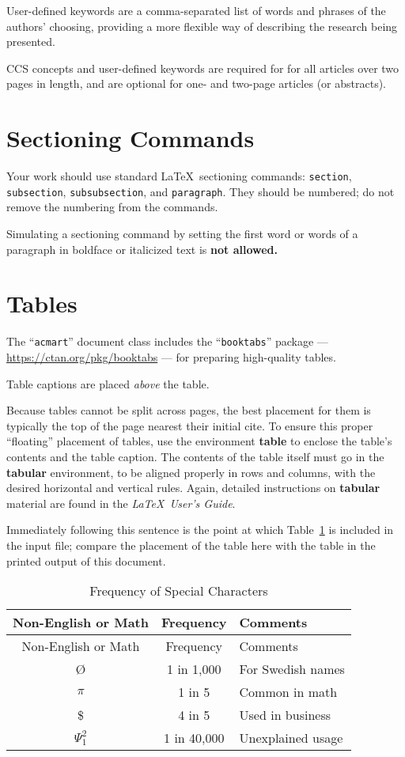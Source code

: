 \documentclass[manuscript,screen,review]{acmart}
\begin{document}
User-defined keywords are a comma-separated list of words and phrases of
the authors' choosing, providing a more flexible way of describing the
research being presented.

CCS concepts and user-defined keywords are required for for all articles
over two pages in length, and are optional for one- and two-page
articles (or abstracts).

\section{Sectioning Commands}\label{sectioning-commands}

Your work should use standard \LaTeX~sectioning commands:
\texttt{section}, \texttt{subsection}, \texttt{subsubsection}, and
\texttt{paragraph}. They should be numbered; do not remove the numbering
from the commands.

Simulating a sectioning command by setting the first word or words of a
paragraph in boldface or italicized text is \textbf{not allowed.}

\section{Tables}\label{tables}

The ``\texttt{acmart}'' document class includes the
``\texttt{booktabs}'' package --- \url{https://ctan.org/pkg/booktabs}
--- for preparing high-quality tables.

Table captions are placed \emph{above} the table.

Because tables cannot be split across pages, the best placement for them
is typically the top of the page nearest their initial cite. To ensure
this proper ``floating'' placement of tables, use the environment
\textbf{table} to enclose the table's contents and the table caption.
The contents of the table itself must go in the \textbf{tabular}
environment, to be aligned properly in rows and columns, with the
desired horizontal and vertical rules. Again, detailed instructions on
\textbf{tabular} material are found in the \emph{\LaTeX~User's Guide}.

Immediately following this sentence is the point at which
Table~\ref{tbl-freq} is included in the input file; compare the
placement of the table here with the table in the printed output of this
document.

\begin{longtable}[]{@{}ccl@{}}
\caption{Frequency of Special Characters}\label{tbl-freq}\tabularnewline
\toprule\noalign{}
Non-English or Math & Frequency & Comments \\
\midrule\noalign{}
\endfirsthead
\toprule\noalign{}
Non-English or Math & Frequency & Comments \\
\midrule\noalign{}
\endhead
\bottomrule\noalign{}
\endlastfoot
Ø & 1 in 1,000 & For Swedish names \\
\(\pi\) & 1 in 5 & Common in math \\
\$ & 4 in 5 & Used in business \\
\(\Psi^2_1\) & 1 in 40,000 & Unexplained usage \\
\end{longtable}
\end{document}
